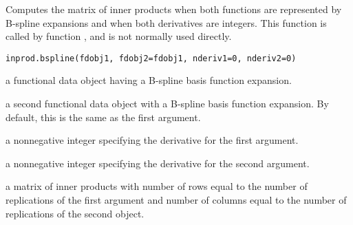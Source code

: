 \documentclass{article}
\begin{document}
\begin{Description}\relax
Computes the matrix of inner products when both functions
are represented by B-spline expansions and when both
derivatives are integers.  This function is called by function
, and is not normally used directly.
\end{Description}
\begin{Usage}
\begin{verbatim}
inprod.bspline(fdobj1, fdobj2=fdobj1, nderiv1=0, nderiv2=0)
\end{verbatim}
\end{Usage}
\begin{Arguments}
\begin{ldescription}
\item[\code{fdobj1}] a functional data object having a B-spline basis function
expansion.

\item[\code{fdobj2}] a second functional data object with a B-spline basis
function expansion.  By default, this is the same as
the first argument.

\item[\code{nderiv1}] a nonnegative integer specifying the derivative for the
first argument.

\item[\code{nderiv2}] a nonnegative integer specifying the derivative for the
second argument.

\end{ldescription}
\end{Arguments}
\begin{Value}
a matrix of inner products with number of rows equal
to the number of replications of the first argument and
number of columns equal to the number of replications
of the second object.
\end{Value}
\end{document}
